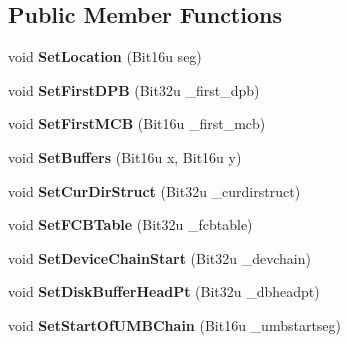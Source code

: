 \subsection*{Public Member Functions}
\begin{DoxyCompactItemize}
\item 
\hypertarget{classDOS__InfoBlock_a417fc25936c4a52f2a99876547b2c147}{void {\bfseries Set\-Location} (Bit16u seg)}\label{classDOS__InfoBlock_a417fc25936c4a52f2a99876547b2c147}

\item 
\hypertarget{classDOS__InfoBlock_ab2bc8d56147b87e53299ae68649ff354}{void {\bfseries Set\-First\-D\-P\-B} (Bit32u \-\_\-first\-\_\-dpb)}\label{classDOS__InfoBlock_ab2bc8d56147b87e53299ae68649ff354}

\item 
\hypertarget{classDOS__InfoBlock_ae414c1cdad096ba6406fb3fc2c0c170c}{void {\bfseries Set\-First\-M\-C\-B} (Bit16u \-\_\-first\-\_\-mcb)}\label{classDOS__InfoBlock_ae414c1cdad096ba6406fb3fc2c0c170c}

\item 
\hypertarget{classDOS__InfoBlock_abc300d0727e3af5fdb36a10825563667}{void {\bfseries Set\-Buffers} (Bit16u x, Bit16u y)}\label{classDOS__InfoBlock_abc300d0727e3af5fdb36a10825563667}

\item 
\hypertarget{classDOS__InfoBlock_ad791de6c1f21c2b80c18e92b27d6c669}{void {\bfseries Set\-Cur\-Dir\-Struct} (Bit32u \-\_\-curdirstruct)}\label{classDOS__InfoBlock_ad791de6c1f21c2b80c18e92b27d6c669}

\item 
\hypertarget{classDOS__InfoBlock_aa071066b03d8296c56d2493897c1fffc}{void {\bfseries Set\-F\-C\-B\-Table} (Bit32u \-\_\-fcbtable)}\label{classDOS__InfoBlock_aa071066b03d8296c56d2493897c1fffc}

\item 
\hypertarget{classDOS__InfoBlock_a18c48672d245da38ab99dfc044a4ba6a}{void {\bfseries Set\-Device\-Chain\-Start} (Bit32u \-\_\-devchain)}\label{classDOS__InfoBlock_a18c48672d245da38ab99dfc044a4ba6a}

\item 
\hypertarget{classDOS__InfoBlock_aabe3e920de901f1a0ad5534dd28f9143}{void {\bfseries Set\-Disk\-Buffer\-Head\-Pt} (Bit32u \-\_\-dbheadpt)}\label{classDOS__InfoBlock_aabe3e920de901f1a0ad5534dd28f9143}

\item 
\hypertarget{classDOS__InfoBlock_a1970bbfbf1221532af106c9029850e39}{void {\bfseries Set\-Start\-Of\-U\-M\-B\-Chain} (Bit16u \-\_\-umbstartseg)}\label{classDOS__InfoBlock_a1970bbfbf1221532af106c9029850e39}


\end{DoxyCompactItemize}
